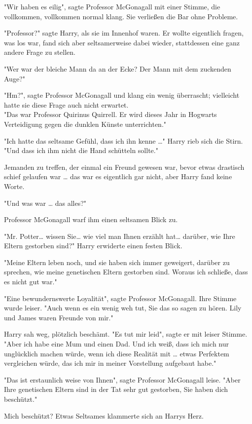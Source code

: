 {"Wir haben es eilig", sagte Professor McGonagall mit einer Stimme, die vollkommen, vollkommen normal klang. Sie verließen die Bar ohne Probleme.

"Professor?" sagte Harry, als sie im Innenhof waren. Er wollte eigentlich fragen, was los war, fand sich aber seltsamerweise dabei wieder, stattdessen eine ganz andere Frage zu stellen.

"Wer war der bleiche Mann da an der Ecke? Der Mann mit dem zuckenden Auge?"

"Hm?", sagte Professor McGonagall und klang ein wenig überrascht; vielleicht hatte sie diese Frage auch nicht erwartet.\\ "Das war Professor Quirinus Quirrell. Er wird dieses Jahr in Hogwarts Verteidigung gegen die dunklen Künste unterrichten."

"Ich hatte das seltsame Gefühl, dass ich ihn kenne …" Harry rieb sich die Stirn. "Und dass ich ihm nicht die Hand schütteln sollte."

Jemanden zu treffen, der einmal ein Freund gewesen war, bevor etwas drastisch schief gelaufen war … das war es eigentlich gar nicht, aber Harry fand keine Worte.

"Und was war … das alles?"

Professor McGonagall warf ihm einen seltsamen Blick zu.

"Mr. Potter… wissen Sie… wie viel man Ihnen erzählt hat… darüber, wie Ihre Eltern gestorben sind?" Harry erwiderte einen festen Blick.

"Meine Eltern leben noch, und sie haben sich immer geweigert, darüber zu sprechen, wie meine genetischen Eltern gestorben sind. Woraus ich schließe, dass es nicht gut war."

"Eine bewundernswerte Loyalität", sagte Professor McGonagall. Ihre Stimme wurde leiser. "Auch wenn es ein wenig weh tut, Sie das so sagen zu hören. Lily und James waren Freunde von mir."

Harry sah weg, plötzlich beschämt. "Es tut mir leid", sagte er mit leiser Stimme. "Aber ich habe eine Mum und einen Dad. Und ich weiß, dass ich mich nur unglücklich machen würde, wenn ich diese Realität mit … etwas Perfektem vergleichen würde, das ich mir in meiner Vorstellung aufgebaut habe."

"Das ist erstaunlich weise von Ihnen", sagte Professor McGonagall leise. "Aber Ihre genetischen Eltern sind in der Tat sehr gut gestorben, Sie haben dich beschützt."

Mich beschützt? Etwas Seltsames klammerte sich an Harrys Herz.

}

